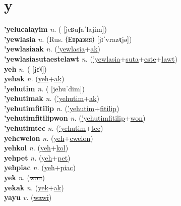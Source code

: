 \section{y}

\textbf{'yelucalayim} \textit{n.} ( [jeʁuʃaˈlajim])
 \label{'yelucalayim} \\
\textbf{'yewlasia} \textit{n.} (Rus. ⟨Евразия⟩ [jɪˈvrazʲɪjə])
 \label{'yewlasia} \\
\textbf{'yewlasiaak} \textit{n.} (\hyperref['yewlasia]{'yewlasia}+\hyperref[ak]{ak})
 \label{'yewlasiaak} \\
\textbf{'yewlasiasutaestelawt} \textit{n.} (\hyperref['yewlasia]{'yewlasia}+\hyperref[suta]{suta}+\hyperref[este]{este}+\hyperref[lawt]{lawt})
 \label{'yewlasiasutaestelawt} \\
\textbf{yeh} \textit{n.} ( [jɛ˥˩])
 \label{yeh} \\
\textbf{yehak} \textit{n.} (\hyperref[yeh]{yeh}+\hyperref[ak]{ak})
 \label{yehak} \\
\textbf{'yehutim} \textit{n.} ( [jehuˈdim])
 \label{'yehutim} \\
\textbf{'yehutimak} \textit{n.} (\hyperref['yehutim]{'yehutim}+\hyperref[ak]{ak})
 \label{'yehutimak} \\
\textbf{'yehutimfitilip} \textit{n.} (\hyperref['yehutim]{'yehutim}+\hyperref[fitilip]{fitilip})
 \label{'yehutimfitilip} \\
\textbf{'yehutimfitilipwon} \textit{n.} (\hyperref['yehutimfitilip]{'yehutimfitilip}+\hyperref[won]{won})
 \label{'yehutimfitilipwon} \\
\textbf{'yehutimtec} \textit{n.} (\hyperref['yehutim]{'yehutim}+\hyperref[tec]{tec})
 \label{'yehutimtec} \\
\textbf{yehcwelon} \textit{n.} (\hyperref[yeh]{yeh}+\hyperref[cwelon]{cwelon})
 \label{yehcwelon} \\
\textbf{yehkol} \textit{n.} (\hyperref[yeh]{yeh}+\hyperref[kol]{kol})
 \label{yehkol} \\
\textbf{yehpet} \textit{n.} (\hyperref[yeh]{yeh}+\hyperref[pet]{pet})
 \label{yehpet} \\
\textbf{yehpiac} \textit{n.} (\hyperref[yeh]{yeh}+\hyperref[piac]{piac})
 \label{yehpiac} \\
\textbf{yek} \textit{n.} (\hyperref[won]{\sout{won}})
 \label{yek} \\
\textbf{yekak} \textit{n.} (\hyperref[yek]{yek}+\hyperref[ak]{ak})
 \label{yekak} \\
\textbf{yayu} \textit{v.} (\hyperref[wawi]{\sout{wawi}})
